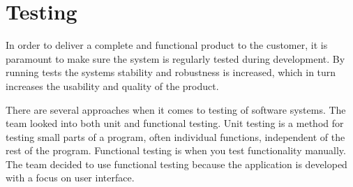 \chapter{Testing}

In order to deliver a complete and functional product to the customer, it is paramount to make sure the system is regularly tested during development. 
By running tests the systems stability and robustness is increased, which in turn increases the usability and quality of the product. 

There are several approaches when it comes to testing of software systems. The team looked into both \gls{unit} and functional testing. Unit testing is a method for testing small parts of a program, often individual functions, independent of the rest of the program. Functional testing is when you test functionality manually. The team decided to use functional testing because the application is developed with a focus on user interface.



